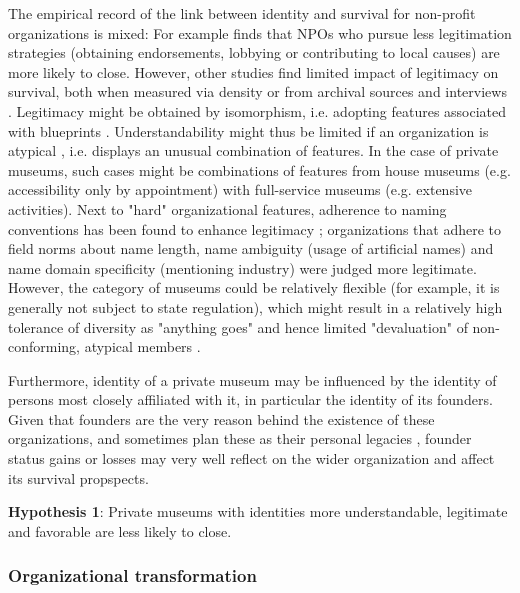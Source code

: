 \documentclass[12pt]{article}
\begin{document}
The empirical record of the link between identity and survival for non-profit organizations is mixed: 
For example \textcite{Bielefeld_1994_survival} finds that NPOs who pursue less legitimation strategies (obtaining endorsements, lobbying or contributing to local causes) are more likely to close.
However, other studies find limited impact of legitimacy on survival, both when measured via density \parencite{Bogaert_etal_2014_ecological} or from archival sources and interviews \parencite{Fernandez_2007_dissolution}.
Legitimacy might be obtained by isomorphism, i.e. adopting features associated with blueprints \parencite{diMaggio_1983_iron}.
Understandability \parencite{Glynn_Abzug_2002_names} might thus be limited if an organization is atypical \parencite{Rosch_1975_family}, i.e. displays an unusual combination of features.
In the case of private museums, such cases might be combinations of features from house museums (e.g. accessibility only by appointment) with full-service museums (e.g. extensive activities). 
Next to "hard" organizational features, adherence to naming conventions has been found to enhance legitimacy \parencite{Glynn_Abzug_2002_names}; organizations that adhere to field norms about name length, name ambiguity (usage of artificial names) and name domain specificity (mentioning industry) were judged more legitimate. 
However, the category of museums could be relatively flexible (for example, it is generally not subject to state regulation), which might result in a relatively high tolerance of diversity as "anything goes" and hence limited "devaluation" of non-conforming, atypical members \parencite{Bogaert_etal_2014_ecological}.


Furthermore, identity of a private museum may be influenced by the identity of persons most closely affiliated with it, in particular the identity of its founders.
Given that founders are the very reason behind the existence of these organizations, and sometimes plan these as their personal legacies \parencite{Walker_2019_collector}, founder status gains or losses may very well reflect on the wider organization and affect its survival propspects.


\bigbreak
\noindent
\textbf{Hypothesis 1}: Private museums with identities more understandable, legitimate and favorable are less likely to close. 



\subsubsection*{Organizational transformation}
\end{document}
